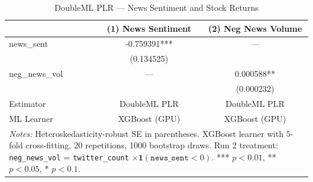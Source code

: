\begin{table}[htbp]
\centering
\caption{DoubleML PLR --- News Sentiment and Stock Returns\label{tab:dml_news}}
\begin{tabular}{lcc}
\hline\hline
 & (1) News Sentiment & (2) Neg News Volume \\
\hline
news\_sent & -0.759391*** & --- \\
& (0.134525) &  \\
neg\_news\_vol & --- & 0.000588** \\
&  & (0.000232) \\
\hline
Estimator & DoubleML PLR & DoubleML PLR \\
ML Learner & XGBoost (GPU) & XGBoost (GPU) \\
\hline\hline
\multicolumn{3}{p{0.95\linewidth}}{\footnotesize \textit{Notes:} Heteroskedasticity-robust SE in parentheses. XGBoost learner with 5-fold cross-fitting, 20 repetitions, 1000 bootstrap draws. Run 2 treatment: \texttt{neg\_news\_vol} = \texttt{twitter\_count} $\times \mathbf{1}(\texttt{news\_sent} < 0)$. *** $p<0.01$, ** $p<0.05$, * $p<0.1$.} \\
\end{tabular}
\end{table}